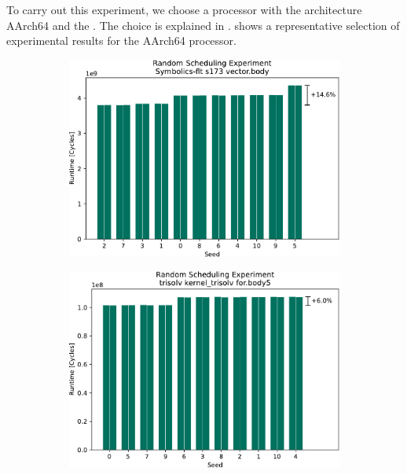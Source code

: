 To carry out this experiment, we choose a processor with the architecture AArch64 and the \auroralong{}.
The choice is explained in .
 shows a representative selection of experimental results for the AArch64 processor.
\begin{figure}
    \begin{subfigure}{0.0325\textwidth}\caption{}\label{fig:eval:rndm:aarch64:a}\end{subfigure}
    \begin{subfigure}{0.44\textwidth}
        \includegraphics[width=\textwidth]{img/random-scheduling-experiment-pi-collected/Symbolics-flt-crop.pdf}
    \end{subfigure}
    \hfill
    \begin{subfigure}{0.0325\textwidth}\caption{}\label{fig:eval:rndm:aarch64:b}\end{subfigure}
    \begin{subfigure}{0.44\textwidth}
        \includegraphics[width=\textwidth]{img/random-scheduling-experiment-pi-collected/trisolv-crop.pdf}
    \end{subfigure}


\end{figure}
